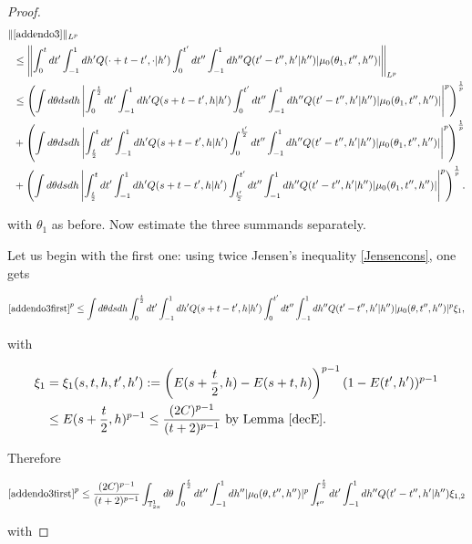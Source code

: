 \documentclass[a4paper,10pt,reqno]{amsart}
\numberwithin{equation}{subsection}
\numberwithin{figure}{subsection}
\begin{document}
\begin{proof}
{\tiny\begin{align}
\nonumber\|&\eqref{addendo3}\|_{L^p}
\\
\nonumber&\leq\left\|\int_0^tdt'\int_{-1}^1dh'Q(\cdot+t-t',\cdot|h')\int_0^{t'}dt''\int_{-1}^1dh''Q(t'-t'',h'|h'')|\mu_0(\theta_1,t'',h'')|\right\|_{L^p}
\\
\label{addendo3first}&\leq\left(\int d\theta dsdh\left|\int_0^{\frac{t}{2}}dt'\int_{-1}^1dh'Q(s+t-t',h|h')\int_0^{t'}dt''\int_{-1}^1dh''Q(t'-t'',h'|h'')|\mu_0(\theta_1,t'',h'')|\right|^p\right)^{\frac{1}{p}}
\\
\label{addendo3second}&+\left(\int d\theta dsdh\left|\int_{\frac{t}{2}}^tdt'\int_{-1}^1dh'Q(s+t-t',h|h')\int_0^{\frac{t'}{2}}dt''\int_{-1}^1dh''Q(t'-t'',h'|h'')|\mu_0(\theta_1,t'',h'')|\right|^p\right)^{\frac{1}{p}}
\\
\label{addendo3third}&+\left(\int d\theta dsdh\left|\int_{\frac{t}{2}}^tdt'\int_{-1}^1dh'Q(s+t-t',h|h')\int_{\frac{t'}{2}}^{t'}dt''\int_{-1}^1dh''Q(t'-t'',h'|h'')|\mu_0(\theta_1,t'',h'')|\right|^p\right)^{\frac{1}{p}}.
\end{align}}

with $\theta_1$ as before. Now estimate the three summands separately.

Let us begin with the first one: using twice Jensen's inequality \eqref{Jensencons}, one gets

{\tiny\begin{align*}
\eqref{addendo3first}^p\leq\int d\theta dsdh\int_0^{\frac{t}{2}}dt'\int_{-1}^1dh'Q(s+t-t',h|h')\int_0^{t'}dt''\int_{-1}^1dh''Q(t'-t'',h'|h'')|\mu_0(\theta,t'',h'')|^p\xi_1,
\end{align*}}

with

\begin{align*}
\xi_1&=\xi_1(s,t,h,t',h'):=\left(E(s+\frac{t}{2},h)-E(s+t,h)\right)^{p-1}(1-E(t',h'))^{p-1}
\\
&\leq E(s+\frac{t}{2},h)^{p-1}\leq\frac{(2C)^{p-1}}{(t+2)^{p-1}}\textrm{ by Lemma \ref{decE}}.
\end{align*}

Therefore

{\footnotesize\begin{align*}
\eqref{addendo3first}^p\leq\frac{(2C)^{p-1}}{(t+2)^{p-1}}\int_{\mathbb{T}^1_{2\pi}}d\theta\int_0^{\frac{t}{2}}dt''\int_{-1}^1dh''|\mu_0(\theta,t'',h'')|^p\int_{t''}^{\frac{t}{2}}dt'\int_{-1}^1dh''Q(t'-t'',h'|h'')\xi_{1,2}
\end{align*}}

with


\end{proof}
\end{document}
